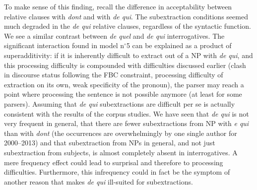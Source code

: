 To make sense of this finding, recall the difference in acceptability between relative clauses with \emph{dont} and with \emph{de qui}. The subextraction conditions seemed much degraded in the \emph{de qui} relative clauses, regardless of the syntactic function. We see a similar contrast between \emph{de quel} and \emph{de qui} interrogatives. The significant interaction found in model n$^{\circ}$5 can be explained as a product of superadditivity: if it is inherently difficult to extract out of a NP with \emph{de qui}, and this processing difficulty is compounded with difficulties discussed earlier (clash in discourse status following the FBC constraint, processing difficulty of extraction on its own, weak specificity of the pronoun), the parser may reach a point where processing the sentence is not possible anymore (at least for some parsers). Assuming that \emph{de qui} subextractions are difficult per se is actually consistent with the results of the corpus studies. We have seen that \emph{de qui} is not very frequent in general, that there are fewer subextractions from NP with \emph{e qui} than with \emph{dont} (the occurrences are overwhelmingly by one single author for 2000--2013) and that subextraction from NPs in general, and not just subextraction from subjects, is almost completely absent in interrogatives. A mere frequency effect could lead to surprisal and therefore to processing difficulties. Furthermore, this infrequency could in fact be the symptom of another reason that makes \emph{de qui} ill-suited for subextractions.
